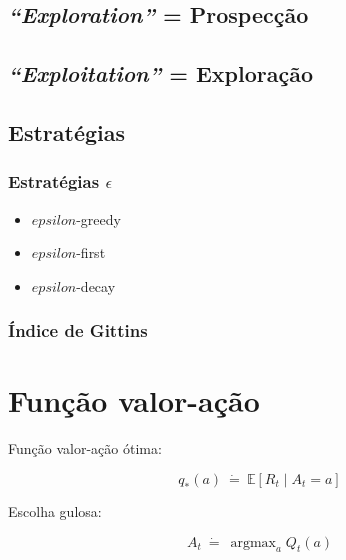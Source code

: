 \documentclass{article}
\DeclareMathOperator*{\argmax}{argmax}
\begin{document}
        \subsection{\textit{``Exploration''} = Prospecção}
        
        \subsection{\textit{``Exploitation''} = Exploração}
    
    \subsection{Estratégias}
    
        \subsubsection{Estratégias $\epsilon$}
        
            \begin{itemize}
                \item $epsilon$-greedy
                \item $epsilon$-first
                \item $epsilon$-decay
            \end{itemize}
        
        \subsubsection{Índice de Gittins}

\section{Função valor-ação}

    Função valor-ação ótima:

    \begin{equation}
        q_*(a) \ \dot{=} \ \mathbb{E}[R_t \mid A_t = a]
    \end{equation}

    Escolha gulosa:

    \begin{equation}
        A_t \ \dot{=} \ \argmax_a Q_t(a)
    \end{equation}
    
\end{document}
